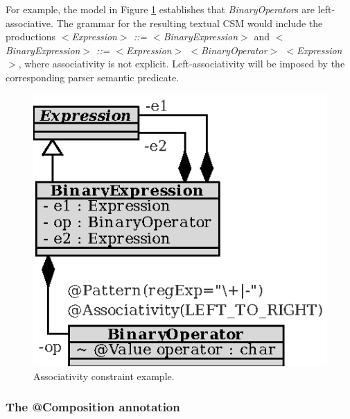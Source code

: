\documentclass[a4paper,twoside,onecolumn]{article}
\newcommand{\etexttt}[1]{\textit{#1}}
\begin{document}
For example, the model in Figure \ref{fig:operator} establishes that \emph{BinaryOperator}s are left-associative.
The grammar for the resulting textual CSM would include the productions \etexttt{$<$Expression$>$ ::= $<$BinaryExpression$>$} and \etexttt{$<$BinaryExpression$>$ ::= $<$Expression$>$ $<$BinaryOperator$>$ $<$Expression$>$}, where associativity is not explicit.
Left-associativity will be imposed by the corresponding parser semantic predicate.

\begin{figure}[tb!]
\centering
\includegraphics[scale=1]{operator.eps}
\caption{Associativity constraint example.} \label{fig:operator}
\end{figure}

\subsubsection{The @Composition annotation}
\end{document}
